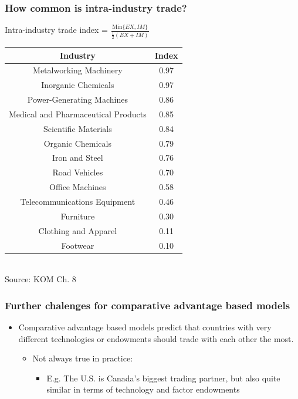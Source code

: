 \documentclass{beamer}
\begin{document}
\begin{frame}
	\frametitle{How common is intra-industry trade?}
\footnotesize
\begin{center}	
	Intra-industry trade index = $\frac{\text{Min}\{EX,IM\}}{\frac{1}{2}\left(EX + IM\right)}$
\end{center}
\begin{center}
	\begin{tabular}{c c }
		\hline
	Industry & Index \\			
		\hline
		Metalworking Machinery & 0.97  \\
		Inorganic Chemicals	& 0.97 \\
		Power-Generating Machines & 0.86 \\
		Medical and Pharmaceutical Products & 0.85  \\
		Scientific Materials & 0.84 \\
				Organic Chemicals & 0.79 \\
						Iron and Steel & 0.76 \\
								Road Vehicles & 0.70 \\
										Office Machines & 0.58 \\
												Telecommunications Equipment & 0.46 \\
														Furniture & 0.30 \\
																Clothing and Apparel & 0.11 \\
																		Footwear & 0.10 \\
		\hline
	\end{tabular}
	\\
		Source: KOM Ch. 8
			
\end{center}
\end{frame}
\begin{frame}
	\frametitle{Further chalenges for comparative advantage based models}
	\begin{itemize}
	\item Comparative advantage based models predict that countries with very different technologies or endowments should trade with each other the most.
		\begin{itemize}
			\item Not always true in practice:
				\begin{itemize}
					\item E.g. The U.S. is Canada's biggest trading partner, but also quite similar in terms of technology and factor endowments
				\end{itemize}
		\end{itemize}
	\end{itemize}
\end{frame}
\end{document}
